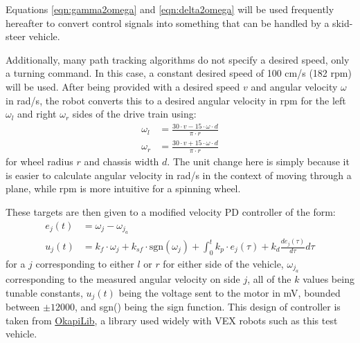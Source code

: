 \documentclass[12pt]{article}
\begin{document}
\begin{flushleft}
Equations \ref{eqn:gamma2omega} and \ref{eqn:delta2omega} will be used frequently hereafter to convert control signals into something that can be handled by a skid-steer vehicle. 

Additionally, many path tracking algorithms do not specify a desired speed, only a turning command. In this case, a constant desired speed of 100 cm/s (182 rpm) will be used. After being provided with a desired speed $v$ and angular velocity $\omega$ in rad/s, the robot converts this to a desired angular velocity in rpm for the left $\omega_l$ and right $\omega_r$ sides of the drive train using:
\begin{subequations}
\begin{align}
\omega_l&= \frac{30 \cdot v - 15 \cdot \omega \cdot d}{\pi \cdot r} \\
\omega_r&= \frac{30 \cdot v + 15 \cdot \omega \cdot d}{\pi \cdot r}
\end{align}
\end{subequations}
for wheel radius $r$ and chassis width $d$. The unit change here is simply because it is easier to calculate angular velocity in rad/s in the context of moving through a plane, while rpm is more intuitive for a spinning wheel.

These targets are then given to a modified velocity PD controller of the form:
\begin{subequations}
\begin{align}
e_j(t) &= \omega_j - \omega_{j_a} \\
u_j(t) &= k_f \cdot \omega_j + k_{sf} \cdot \text{sgn}(\omega_j) + \int_0^t \! k_p \cdot e_j(\tau) + k_d \frac{de_j(\tau)}{d\tau} d\tau
\end{align}
\end{subequations}
for a $j$ corresponding to either $l$ or $r$ for either side of the vehicle, $\omega_{j_a}$ corresponding to the measured angular velocity on side $j$, all of the $k$ values being tunable constants, $u_j(t)$ being the voltage sent to the motor in mV, bounded between $\pm12000$, and sgn() being the sign function. This design of controller is taken from \href{https://github.com/OkapiLib/OkapiLib}{OkapiLib}, a library used widely with VEX robots such as this test vehicle. 


\end{flushleft}
\end{document}
